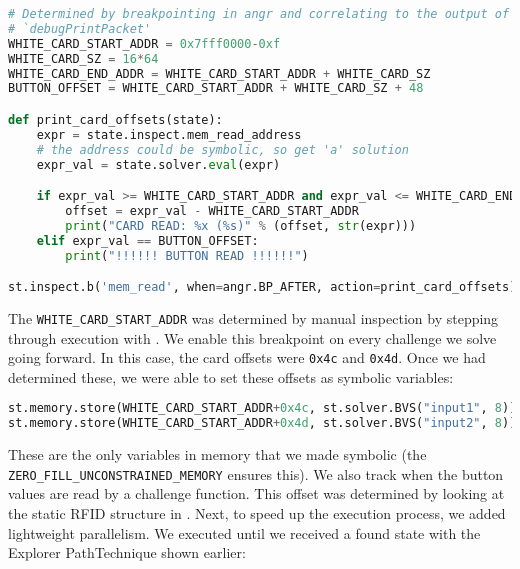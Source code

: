 \begin{lstlisting}[language=python]
# Determined by breakpointing in angr and correlating to the output of
# `debugPrintPacket'
WHITE_CARD_START_ADDR = 0x7fff0000-0xf
WHITE_CARD_SZ = 16*64
WHITE_CARD_END_ADDR = WHITE_CARD_START_ADDR + WHITE_CARD_SZ
BUTTON_OFFSET = WHITE_CARD_START_ADDR + WHITE_CARD_SZ + 48

def print_card_offsets(state):
    expr = state.inspect.mem_read_address
    # the address could be symbolic, so get 'a' solution
    expr_val = state.solver.eval(expr)

    if expr_val >= WHITE_CARD_START_ADDR and expr_val <= WHITE_CARD_END_ADDR:
        offset = expr_val - WHITE_CARD_START_ADDR
        print("CARD READ: %x (%s)" % (offset, str(expr)))
    elif expr_val == BUTTON_OFFSET:
        print("!!!!!! BUTTON READ !!!!!!")

st.inspect.b('mem_read', when=angr.BP_AFTER, action=print_card_offsets)
\end{lstlisting}

The \texttt{WHITE\_CARD\_START\_ADDR} was determined by manual inspection by stepping through execution with \angr. We enable this breakpoint on every challenge we solve going forward.
In this case, the card offsets were \texttt{0x4c} and \texttt{0x4d}. Once we had determined these, we were able to set these offsets as symbolic variables:

\begin{lstlisting}[language=python]
st.memory.store(WHITE_CARD_START_ADDR+0x4c, st.solver.BVS("input1", 8))
st.memory.store(WHITE_CARD_START_ADDR+0x4d, st.solver.BVS("input2", 8))
\end{lstlisting}

These are the only variables in memory that we made symbolic (the \texttt{ZERO\_FILL\_UNCONSTRAINED\_MEMORY} ensures this).
We also track when the button values are read by a challenge function. This offset was determined by looking at the static RFID structure in \ghidra.
Next, to speed up the execution process, we added lightweight parallelism. We executed until we received a found state with the Explorer PathTechnique shown earlier:

